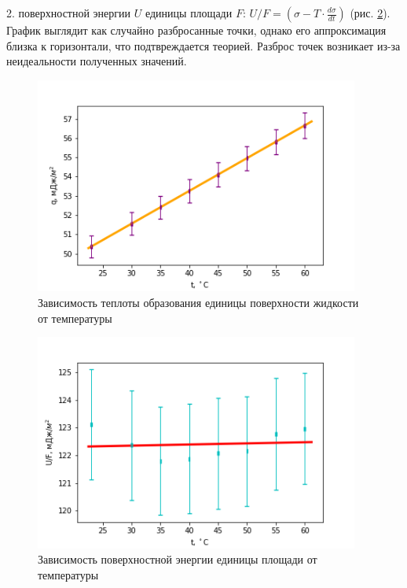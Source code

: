 \documentclass[a4paper,12pt]{article} %
\begin{document}
2. поверхностной энергии $U$ единицы площади $F$:  $U/F = (\sigma -T\cdot  \frac{d\sigma}{dt})$ (рис. \ref{U/F}). График выглядит как случайно разбросанные точки, однако его аппроксимация близка к горизонтали, что подтвреждается теорией. Разброс точек возникает из-за неидеальности полученных значений.

\begin{figure}[h!]
\begin{center}
\includegraphics[width=0.95\textwidth]{q}
\end{center}
\caption{Зависимость теплоты образования единицы поверхности жидкости от температуры} \label{q}
\end{figure}

\begin{figure}[h!]
\begin{center}
\includegraphics[width=0.95\textwidth]{U}
\end{center}
\caption{Зависимость поверхностной энергии единицы площади от температуры} \label{U/F}
\end{figure}
\end{document}
